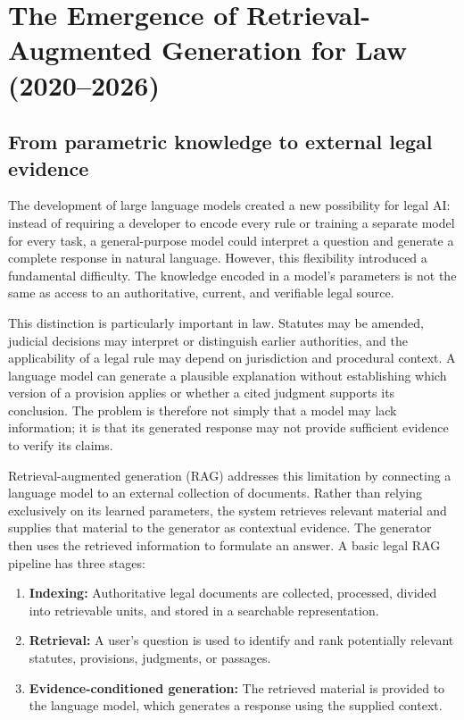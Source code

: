 \section{The Emergence of Retrieval-Augmented Generation for Law (2020--2026)}
\label{sec:rag}

\subsection{From parametric knowledge to external legal evidence}

The development of large language models created a new possibility for legal AI: instead of
requiring a developer to encode every rule or training a separate model for every task, a
general-purpose model could interpret a question and generate a complete response in natural
language. However, this flexibility introduced a fundamental difficulty. The knowledge encoded in a
model's parameters is not the same as access to an authoritative, current, and verifiable legal
source.

This distinction is particularly important in law. Statutes may be amended, judicial decisions may
interpret or distinguish earlier authorities, and the applicability of a legal rule may depend on
jurisdiction and procedural context. A language model can generate a plausible explanation without
establishing which version of a provision applies or whether a cited judgment supports its
conclusion. The problem is therefore not simply that a model may lack information; it is that its
generated response may not provide sufficient evidence to verify its claims.

Retrieval-augmented generation (RAG) addresses this limitation by connecting a language model to an
external collection of documents. Rather than relying exclusively on its learned parameters, the
system retrieves relevant material and supplies that material to the generator as contextual
evidence. The generator then uses the retrieved information to formulate an answer. A basic legal
RAG pipeline has three stages:
\begin{enumerate}[leftmargin=1.4em, itemsep=2pt, topsep=2pt]
\item \textbf{Indexing:} Authoritative legal documents are collected, processed, divided into
retrievable units, and stored in a searchable representation.
\item \textbf{Retrieval:} A user's question is used to identify and rank potentially relevant
statutes, provisions, judgments, or passages.
\item \textbf{Evidence-conditioned generation:} The retrieved material is provided to the language
model, which generates a response using the supplied context.
\end{enumerate}

